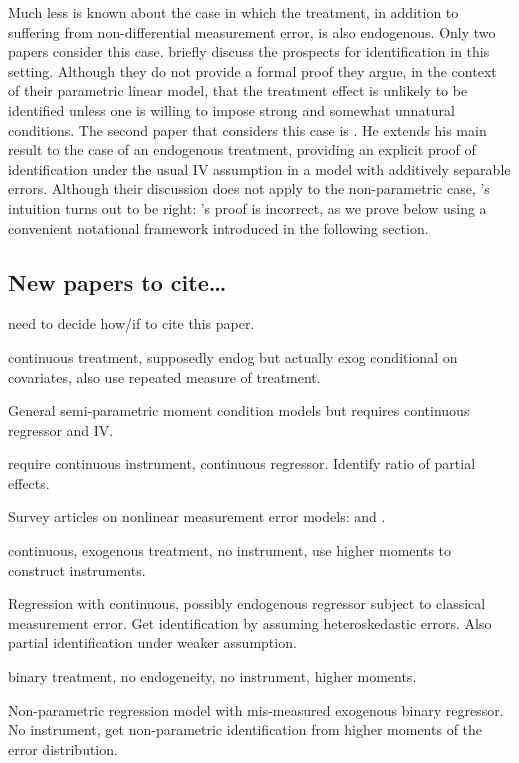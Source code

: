 Much less is known about the case in which the treatment, in addition to suffering from non-differential measurement error, is also endogenous.
Only two papers consider this case.
\cite{FL} briefly discuss the prospects for identification in this setting.
Although they do not provide a formal proof they argue, in the context of their parametric linear model, that the treatment effect is unlikely to be identified unless one is willing to impose strong and somewhat unnatural conditions. 
The second paper that considers this case is \cite{Mahajan}.
He extends his main result to the case of an endogenous treatment, providing an explicit proof of identification under the usual IV assumption in a model with additively separable errors.
Although their discussion does not apply to the non-parametric case, \citeauthor{FL}'s intuition turns out to be right: \citeauthor{Mahajan}'s proof is incorrect, as we prove below using a convenient notational framework introduced in the following section.

\subsection{New papers to cite\dots}

\cite{Card} need to decide how/if to cite this paper.

\cite{SongSchennachWhite} continuous treatment, supposedly endog but actually exog conditional on covariates, also use repeated measure of treatment.

\cite{song2015} General semi-parametric moment condition models but requires continuous regressor and IV. 

\cite{HuShiuWoutersen} require continuous instrument, continuous regressor. Identify ratio of partial effects.

Survey articles on nonlinear measurement error models: \cite{chensurvey} and \cite{SchennachSurvey}.

\cite{lewbel1997} continuous, exogenous treatment, no instrument, use higher moments to construct instruments.

\cite{lewbel2012} Regression with continuous, possibly endogenous regressor subject to classical measurement error. Get identification by assuming heteroskedastic errors.
Also partial identification under weaker assumption.

\cite{ChenHuLewbel} binary treatment, no endogeneity, no instrument, higher moments.

\cite{ChenHuLewbel2} Non-parametric regression model with mis-measured exogenous binary regressor. No instrument, get non-parametric identification from higher moments of the error distribution.

